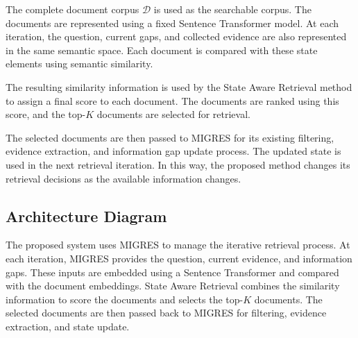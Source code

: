 \documentclass[12pt,a4paper]{report}
\begin{document}
The complete document corpus $\mathcal{D}$ is used as the searchable corpus. The documents are represented using a fixed Sentence Transformer model. At each iteration, the question, current gaps, and collected evidence are also represented in the same semantic space. Each document is compared with these state elements using semantic similarity.

The resulting similarity information is used by the State Aware Retrieval method to assign a final score to each document. The documents are ranked using this score, and the top-$K$ documents are selected for retrieval.

The selected documents are then passed to MIGRES for its existing filtering, evidence extraction, and information gap update process. The updated state is used in the next retrieval iteration. In this way, the proposed method changes its retrieval decisions as the available information changes.
\clearpage

\subsection{Architecture Diagram}

The proposed system uses MIGRES to manage the iterative retrieval process. At each iteration, MIGRES provides the question, current evidence, and information gaps. These inputs are embedded using a Sentence Transformer and compared with the document embeddings. State Aware Retrieval combines the similarity information to score the documents and selects the top-$K$ documents. The selected documents are then passed back to MIGRES for filtering, evidence extraction, and state update.
\end{document}
